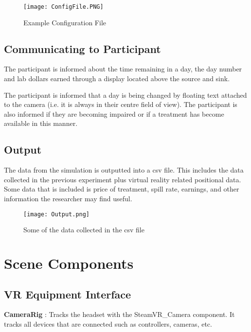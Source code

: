 \documentclass{article}
\begin{document}
\begin{figure}[h!]
\centering
\texttt{[image: ConfigFile.PNG]}
\caption{Example Configuration File}
\label{fig:configfile}
\end{figure}


\subsection{Communicating to Participant}
The participant is informed about the time remaining in a day, the day number and lab dollars earned through a display located above the source and sink. 

The participant is informed that a day is being changed by floating text attached to the camera (i.e. it is always in their centre field of view). The participant is also informed if they are becoming impaired or if a treatment has become available in this manner.

\subsection{Output}
The data from the simulation is outputted into a csv file. This includes the data collected in the previous experiment plus virtual reality related positional data. Some data that is included is price of treatment, spill rate, earnings, and other information the researcher may find useful.

\begin{figure}[h!]
\centering
\texttt{[image: Output.png]}
\caption{Some of the data collected in the csv file}
\label{fig:flowchart}
\end{figure}


\section{Scene Components}
\subsection{VR Equipment Interface} %
\textbf{CameraRig} : Tracks the headset with the SteamVR\_Camera component. It tracks all devices that are connected such as controllers, cameras, etc.
\end{document}
